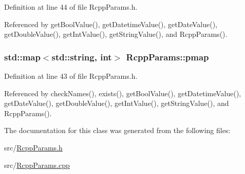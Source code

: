 Definition at line 44 of file RcppParams.h.

Referenced by getBoolValue(), getDatetimeValue(), getDateValue(), getDoubleValue(), getIntValue(), getStringValue(), and RcppParams().\hypertarget{classRcppParams_a399697fc90ba3136c61dd6e20931bd8b}{
\subsubsection[{pmap}]{\setlength{\rightskip}{0pt plus 5cm}std::map$<$std::string, int$>$ {\bf RcppParams::pmap}}}
\label{classRcppParams_a399697fc90ba3136c61dd6e20931bd8b}


Definition at line 43 of file RcppParams.h.

Referenced by checkNames(), exists(), getBoolValue(), getDatetimeValue(), getDateValue(), getDoubleValue(), getIntValue(), getStringValue(), and RcppParams().

The documentation for this class was generated from the following files:\begin{DoxyCompactItemize}
\item 
src/\hyperlink{RcppParams_8h}{RcppParams.h}\item 
src/\hyperlink{RcppParams_8cpp}{RcppParams.cpp}\end{DoxyCompactItemize}
